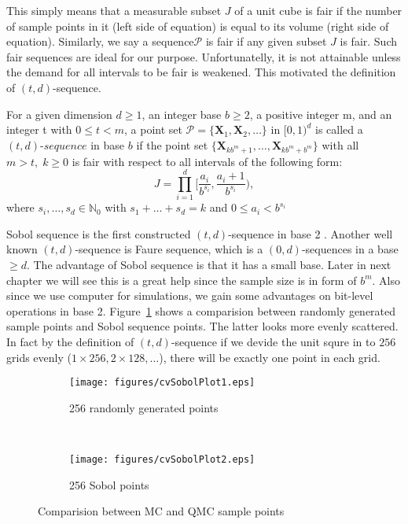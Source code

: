 This simply means that a measurable subset $J$ of a unit cube is fair if the number of sample points in it (left side of equation) is equal to its volume (right side of equation). 
Similarly, we say a sequence$\mathscr{P}$ is fair if any given subset $J$ is fair.  
Such fair sequences are ideal for our purpose. Unfortunatelly, it is not attainable unless the demand for all intervals to be fair is weakened. This motivated the definition of $(t,d)$-sequence. 
\theoremstyle{definition}
\begin{definition}{}
    For a given dimension $d \geq 1$, an integer base $b \geq 2$, a positive integer m, and an integer t with $0 \leq t < m$, a point set $\mathscr{P} =\{\mathbf{X}_1,\mathbf{X}_2,\dots\}$ in $[0, 1)^d$ is called a $\textit{$(t,d)$-sequence}$ in base $b$ 
if the point set $\{\mathbf{X}_{kb^m+1},\dots,\mathbf{X}_{kb^m+b^m}\}$ with all $m>t,\;k\geq 0$ is fair with respect to all intervals of the following form:
    \[
        J=\prod_{i=1}^{d}\Big[\frac{a_i}{b^{s_i}}, \frac{a_i+1}{b^{s_i}}\Big),
                    \]
                    where $s_i,\dots, s_d\in\mathbb{N}_0$ with $s_1+\dots+s_d=k$ and $0\leq a_i < b^{s_i}$  
\end{definition}

Sobol sequence is the first constructed $(t,d)$-sequence in base 2 \cite{dick2010digital}. Another well known $(t,d)$-sequence is Faure sequence, which is a $(0, d)$-sequences in a base$\geq d$. 
The advantage of Sobol sequence is that it has a small base. 
Later in next chapter we will see this is a great help since the sample size is in form of $b^m$. 
Also since we use computer for simulations, we gain some advantages on bit-level operations in base 2.
Figure~\ref{fg:sobol} shows a comparision between randomly generated sample points and Sobol sequence points. 
The latter looks more evenly scattered. 
In fact by the definition of $(t,d)$-sequence if we devide the unit squre in to $256$ grids evenly ($1\times256, 2\times128,\dots$), there will be exactly one point in each grid.  

\begin{figure}
    \centering
    \begin{subfigure}[b]{.5\textwidth}
    \texttt{[image: figures/cvSobolPlot1.eps]}
    \caption{256 randomly generated points}
    \end{subfigure}~\begin{subfigure}[b]{.5\textwidth}
    \texttt{[image: figures/cvSobolPlot2.eps]}
    \caption{256 Sobol points}
    \end{subfigure}
    \caption{Comparision between MC and QMC sample points}\label{fg:sobol}
\end{figure}

